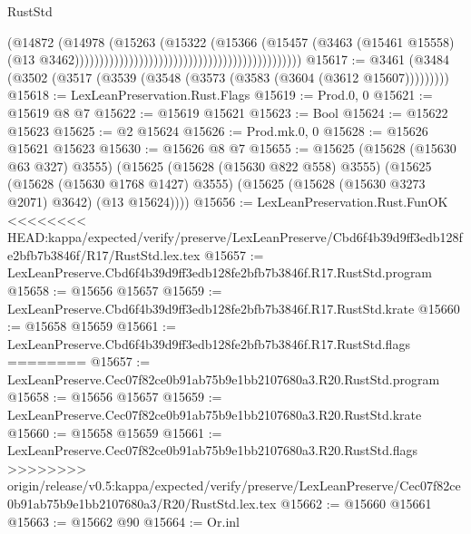 \begin{lexlean}{RustStd}
\begin{coremodule}
{\begin{coremodule}
{{{{{{{{{{{{{{{{{{{{{{{{{{{{{{{{{{{{{{{{{{{{{{{                                                                                (@14872
                                                                                  (@14978
                                                                                    (@15263
                                                                                      (@15322
                                                                                        (@15366
                                                                                          (@15457
                                                                                            (@3463
                                                                                              (@15461
                                                                                                @15558)
                                                                                              (@13
                                                                                                @3462))))))))))))))))))))))))))))))))))))))))))))))
@15617 := @3461 (@3484 (@3502 (@3517 (@3539 (@3548 (@3573 (@3583 (@3604 (@3612 @15607)))))))))
@15618 := LexLeanPreservation.Rust.Flags
@15619 := Prod.{0, 0}
@15621 := @15619 @8 @7
@15622 := @15619 @15621
@15623 := Bool
@15624 := @15622 @15623
@15625 := @2 @15624
@15626 := Prod.mk.{0, 0}
@15628 := @15626 @15621 @15623
@15630 := @15626 @8 @7
@15655 := @15625
    (@15628 (@15630 @63 @327) @3555)
    (@15625
      (@15628 (@15630 @822 @558) @3555)
      (@15625
        (@15628 (@15630 @1768 @1427) @3555)
        (@15625 (@15628 (@15630 @3273 @2071) @3642) (@13 @15624))))
@15656 := LexLeanPreservation.Rust.FunOK
<<<<<<<< HEAD:kappa/expected/verify/preserve/LexLeanPreserve/Cbd6f4b39d9ff3edb128fe2bfb7b3846f/R17/RustStd.lex.tex
@15657 := LexLeanPreserve.Cbd6f4b39d9ff3edb128fe2bfb7b3846f.R17.RustStd.program
@15658 := @15656 @15657
@15659 := LexLeanPreserve.Cbd6f4b39d9ff3edb128fe2bfb7b3846f.R17.RustStd.krate
@15660 := @15658 @15659
@15661 := LexLeanPreserve.Cbd6f4b39d9ff3edb128fe2bfb7b3846f.R17.RustStd.flags
========
@15657 := LexLeanPreserve.Cec07f82ce0b91ab75b9e1bb2107680a3.R20.RustStd.program
@15658 := @15656 @15657
@15659 := LexLeanPreserve.Cec07f82ce0b91ab75b9e1bb2107680a3.R20.RustStd.krate
@15660 := @15658 @15659
@15661 := LexLeanPreserve.Cec07f82ce0b91ab75b9e1bb2107680a3.R20.RustStd.flags
>>>>>>>> origin/release/v0.5:kappa/expected/verify/preserve/LexLeanPreserve/Cec07f82ce0b91ab75b9e1bb2107680a3/R20/RustStd.lex.tex
@15662 := @15660 @15661
@15663 := @15662 @90
@15664 := Or.inl
}}}}}}}}}}}}}}}}}}}}}}}}}}}}}}}}}}}}}}}}}}}}}}}
\end{coremodule}}
\end{coremodule}
\end{lexlean}
